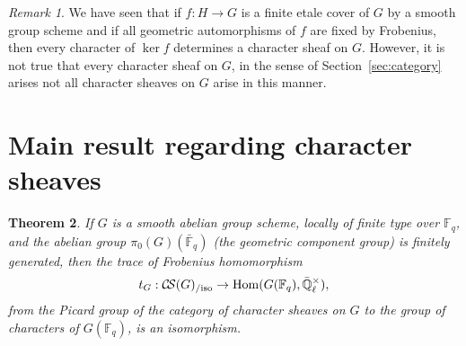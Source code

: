 \documentclass[11pt]{amsart}
\theoremstyle{plain}
\newtheorem{theorem}{Theorem}[section]
\theoremstyle{definition}
\theoremstyle{remark}
\newtheorem{remark}[theorem]{Remark}
\newcommand{\EE}{\mathbb{\bar Q}_\ell}
\newcommand{\bFq}{{\mathbb{\bar F}_q}}
\newcommand{\Fq}{{\mathbb{F}_q}}
\DeclareMathOperator{\Hom}{Hom}
\newcommand{\CS}{{\mathcal{C\hskip-1.8pt S}}}
\begin{document}
\begin{remark}
We have seen that if $f : H\to G$ is a finite etale cover of $G$ by a smooth group scheme and if all geometric automorphisms of $f$ are fixed by Frobenius, then every character of $\ker f$ determines a character sheaf on $G$. However, it is not true that every character sheaf on $G$, in the sense of Section~\ref{sec:category} arises not all character sheaves on $G$ arise in this manner. 
\end{remark}
%

\section{Main result regarding character sheaves}

%
\begin{theorem}\label{thm:snake}
If $G$ is a smooth abelian group scheme, locally of finite type over $\Fq$, and the abelian group $\pi_0(G)(\bFq)$ (the geometric component group) is finitely generated, then the trace of Frobenius homomorphism
\[
t_{G} : \CS(G)_{/\text{iso}} \to \Hom(G(\Fq),\EE^\times),
\]
from the Picard group of the category of character sheaves on $G$ to the group of characters of $G(\Fq)$, is an isomorphism. 
\end{theorem}
\end{document}
